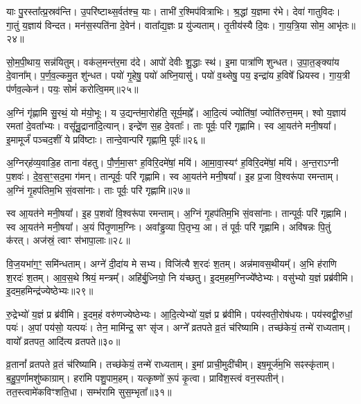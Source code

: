 याः पु॒रस्ता᳚त्प्र॒स्रव॑न्ति।
उ॒परि॑ष्टाथ्स॒र्वत॑श्च॒ याः।
ताभी॑ र॒श्मिप॑वित्राभिः।
श्र॒द्धां य॒ज्ञमा र॑भे।
देवा॑ गातुविदः।
गा॒तुं य॒ज्ञाय॑ विन्दत।
मन॑स॒स्पति॑ना दे॒वेन॑।
वाता᳚द्य॒ज्ञः प्र यु॑ज्यताम्।
तृ॒तीय॑स्यै दि॒वः।
गा॒य॒त्रि॒या सोम॒ आभृ॑तः॥२४॥

सो॒म॒पी॒थाय॒ सन्न॑यितुम्।
वक॑ल॒मन्त॑र॒मा द॑दे।
आपो॑ देवीः शु॒द्धाः स्थ॑।
इ॒मा पात्रा॑णि शुन्धत।
उ॒पा॒त॒ङ्क्या॑य दे॒वाना᳚म्।
प॒र्ण॒व॒ल्कमु॒त शु॑न्धत।
पयो॑ गृ॒हेषु॒ पयो॑ अघ्नि॒यासु॑।
पयो॑ व॒थ्सेषु॒ पय॒ इन्द्रा॑य ह॒विषे᳚ ध्रियस्व।
गा॒य॒त्री प॑र्णव॒ल्केन॑।
पयः॒ सोमं॑ करोत्वि॒मम्॥२५॥

अ॒ग्निं गृ॑ह्णामि सु॒रथं॒ यो म॑यो॒भूः।
य उ॒द्यन्त॑मा॒रोह॑ति॒ सूर्य॒मह्ने᳚।
आ॒दि॒त्यं ज्योति॑षां॒ ज्योति॑रुत्त॒मम्।
श्वो य॒ज्ञाय॑ रमतां दे॒वता᳚भ्यः।
वसू᳚न्रु॒द्राना॑दि॒त्यान्।
इन्द्रे॑ण स॒ह दे॒वताः᳚।
ताः पूर्वः॒ परि॑ गृह्णामि।
स्व आ॒यत॑ने मनी॒षया᳚।
इ॒मामूर्जं॑ पञ्चद॒शीं ये प्रवि॑ष्टाः।
तान्दे॒वान्परि॑ गृह्णामि॒ पूर्वः॑॥२६॥

अ॒ग्निर्‌\mbox{}ह॑व्य॒वाडि॒ह ताना व॑हतु।
पौ॒र्ण॒मा॒सꣳ ह॒विरि॒दमे॑षां॒ मयि॑।
आ॒मा॒वा॒स्यꣳ॑ ह॒विरि॒दमे॑षां॒ मयि॑।
अ॒न्त॒रा\-ऽग्नी प॒शवः॑।
दे॒व॒स॒ꣳ॒सद॒मा ग॑मन्।
तान्पूर्वः॒ परि॑ गृह्णामि।
स्व आ॒यत॑ने मनी॒षया᳚।
इ॒ह प्र॒जा वि॒श्वरू॑पा रमन्ताम्।
अ॒ग्निं गृ॒हप॑तिम॒भि सं॒वसा॑नाः।
ताः पूर्वः॒ परि॑ गृह्णामि॥२७॥

स्व आ॒यत॑ने मनी॒षया᳚।
इ॒ह प॒शवो॑ वि॒श्वरू॑पा रमन्ताम्।
अ॒ग्निं गृ॒हप॑तिम॒भि सं॒वसा॑नाः।
तान्पूर्वः॒ परि॑ गृह्णामि।
स्व आ॒यत॑ने मनी॒षया᳚।
अ॒यं पि॑तृ॒णाम॒ग्निः।
अवा᳚ड्ढ॒व्या पि॒तृभ्य॒ आ।
तं पूर्वः॒ परि॑ गृह्णामि।
अवि॑षन्नः पि॒तुं क॑रत्।
अज॑स्रं॒ त्वाꣳ स॑भापा॒लाः॥२८॥

वि॒ज॒यभा॑ग॒ꣳ॒ समि॑न्धताम्।
अग्ने॑ दी॒दा॑य मे सभ्य।
विजि॑त्यै श॒रदः॑ श॒तम्।
अन्न॑मावस॒थीयम्᳚।
अ॒भि ह॑राणि श॒रदः॑ श॒तम्।
आ॒व॒स॒थे श्रियं॒ मन्त्रम्᳚।
अहि॑र्बु॒ध्नियो॒ नि य॑च्छतु।
इ॒द\-म॒ह\-म॒ग्नि\-ज्ये᳚ष्ठेभ्यः।
वसु॑भ्यो य॒ज्ञं प्रब्र॑वीमि।
इ॒द\-म॒ह\-मिन्द्र॑\-ज्येष्ठेभ्यः॥२९॥

रु॒द्रेभ्यो॑ य॒ज्ञं प्र ब्र॑वीमि।
इ॒दम॒हं वरु॑णज्येष्ठेभ्यः।
आ॒दि॒त्येभ्यो॑ य॒ज्ञं प्र ब्र॑वीमि।
पय॑स्वती॒रोष॑धयः।
पय॑स्वद्वी॒रुधां॒ पयः॑।
अ॒पां पय॑सो॒ यत्पयः॑।
तेन॒ मामि॑न्द्र॒ सꣳ सृ॑ज।
अग्ने᳚ व्रतपते व्र॒तं च॑रिष्यामि।
तच्छ॑केयं॒ तन्मे॑ राध्यताम्।
वायो᳚ व्रतपत॒ आदि॑त्य व्रतपते॥३०॥

व्र॒तानां᳚ व्रतपते व्र॒तं च॑रिष्यामि।
तच्छ॑केयं॒ तन्मे॑ राध्यताम्।
इ॒मां प्राची॒मुदी॑चीम्।
इष॒मूर्ज॑म॒भि सꣴस्कृ॑ताम्।
ब॒हु॒प॒र्णामशु॑ष्काग्राम्।
हरा॑मि पशु॒पाम॒हम्।
यत्कृष्णो॑ रू॒पं कृ॒त्वा।
प्रावि॑श॒स्त्वं वन॒स्पतीन्॑।
तत॒स्त्वामे॑कविꣳशति॒धा।
सम्भ॑रामि सुस॒म्भृता᳚॥३१॥

